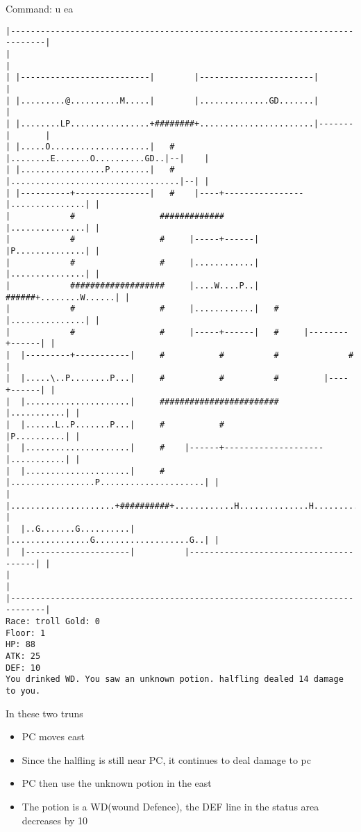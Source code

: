\documentclass[11pt]{article}
\theoremstyle{plain}
\begin{document}
Command: u ea
\begin{Verbatim}[fontsize=\small]
|-----------------------------------------------------------------------------|
|                                                                             |
| |--------------------------|        |-----------------------|               |
| |.........@..........M.....|        |..............GD.......|               |
| |........LP................+########+.......................|-------|       |
| |.....O....................|   #    |........E.......O..........GD..|--|    |
| |.................P........|   #    |..................................|--| |
| |----------+---------------|   #    |----+----------------|...............| |
|            #                 #############                |...............| |
|            #                 #     |-----+------|         |P..............| |
|            #                 #     |............|         |...............| |
|            ###################     |....W....P..|   ######+........W......| |
|            #                 #     |............|   #     |...............| |
|            #                 #     |-----+------|   #     |--------+------| |
|  |---------+-----------|     #           #          #              #        |
|  |.....\..P........P...|     #           #          #         |----+------| |
|  |.....................|     ########################         |...........| |
|  |......L..P.......P...|     #           #                    |P..........| |
|  |.....................|     #    |------+--------------------|...........| |
|  |.....................|     #    |.................P.....................| |
|  |.....................+##########+............H..............H...........| |
|  |..G.......G..........|          |................G...................G..| |
|  |---------------------|          |---------------------------------------| |
|                                                                             |
|-----------------------------------------------------------------------------|
Race: troll Gold: 0                                                    Floor: 1
HP: 88
ATK: 25
DEF: 10
You drinked WD. You saw an unknown potion. halfling dealed 14 damage to you. 
\end{Verbatim}

In these two truns
\begin{itemize}
    \item PC moves east
    \item Since the halfling is still near PC, it continues to deal damage to pc
    \item PC then use the unknown potion in the east
    \item The potion is a WD(wound Defence), the DEF line in the status area decreases by 10
\end{itemize}
\end{document}
